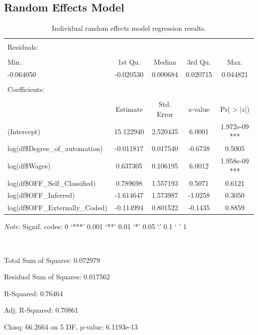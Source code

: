 \documentclass[12pt]{article}
\begin{document}
\newpage

\subsection{Random Effects Model}

\begin{table}[!htbp] \centering 
\begin{threeparttable}
  \caption{Individual random effects model regression results.} 
  \label{} 
\begin{tabular}{@{\extracolsep{5pt}}lcccc} 
 \toprule
\midrule
\\
Residuals: \\
\hline \\[-1.8ex]
     Min.  &  1st Qu. &    Median  &  3rd Qu.  &     Max.  \\
-0.064050 & -0.020530 &  0.000684 &  0.020715 &  0.044821  \\
 \\
Coefficients: \\
\hline \\[-1.8ex]
             &                 Estimate & Std. Error & z-value &  Pr($>|z|$)     \\
(Intercept)           &        15.122940   & 2.520435  & 6.0001 & 1.972e-09 *** \\
log(df\$Degree\_of\_automation) & -0.011817 &   0.017540 & -0.6738  &   0.5005     \\
log(df\$Wages)         &         0.637305 &   0.106195 &  6.0012 & 1.958e-09 *** \\
log(df\$OFF\_Self\_Classified) &   0.789698  & 1.557193  & 0.5071  &   0.6121     \\
log(df\$OFF\_Inferred)     &     -1.614647 &   1.573987 & -1.0258  &   0.3050     \\
log(df\$OFF\_Externally\_Coded) & -0.114994 &   0.801522 & -0.1435  &   0.8859     \\
\bottomrule
 \end{tabular}
 \begin{tablenotes}
\item \textit{Note:} Signif. codes:  0 ‘***’ 0.001 ‘**’ 0.01 ‘*’ 0.05 ‘.’ 0.1 ‘ ’ 1
\item \ 
\item Total Sum of Squares:    0.072979
\item Residual Sum of Squares: 0.017562
\item R-Squared:      0.76464
\item Adj. R-Squared: 0.70861
\item Chisq: 66.2664 on 5 DF, p-value: 6.1193e-13
\end{tablenotes}
  \end{threeparttable}
\end{table} 
\end{document}
